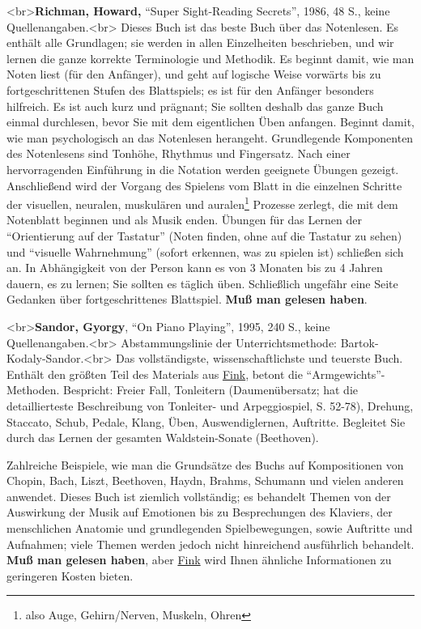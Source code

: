 <br>\textbf{Richman, Howard,} \enquote{Super Sight-Reading Secrets}, 1986, 48 S., keine Quellenangaben.<br>
Dieses Buch ist das beste Buch über das Notenlesen.
Es enthält alle Grundlagen; sie werden in allen Einzelheiten beschrieben, und wir lernen die ganze korrekte Terminologie und Methodik.
Es beginnt damit, wie man Noten liest (für den Anfänger), und geht auf logische Weise vorwärts bis zu fortgeschrittenen Stufen des Blattspiels; es ist für den Anfänger besonders hilfreich.
Es ist auch kurz und prägnant; Sie sollten deshalb das ganze Buch einmal durchlesen, bevor Sie mit dem eigentlichen Üben anfangen.
Beginnt damit, wie man psychologisch an das Notenlesen herangeht.
Grundlegende Komponenten des Notenlesens sind Tonhöhe, Rhythmus und Fingersatz.
Nach einer hervorragenden Einführung in die Notation werden geeignete Übungen gezeigt.
Anschließend wird der Vorgang des Spielens vom Blatt in die einzelnen Schritte der visuellen, neuralen, muskulären und auralen\footnote{also Auge, Gehirn/Nerven, Muskeln, Ohren} Prozesse zerlegt, die mit dem Notenblatt beginnen und als Musik enden.
Übungen für das Lernen der \enquote{Orientierung auf der Tastatur} (Noten finden, ohne auf die Tastatur zu sehen) und \enquote{visuelle Wahrnehmung} (sofort erkennen, was zu spielen ist) schließen sich an.
In Abhängigkeit von der Person kann es von 3 Monaten bis zu 4 Jahren dauern, es zu lernen; Sie sollten es täglich üben.
Schließlich ungefähr eine Seite Gedanken über fortgeschrittenes Blattspiel.
\textbf{Muß man gelesen haben}.


\label{Sandor}

<br>\textbf{Sandor, Gyorgy}, \enquote{On Piano Playing}, 1995, 240 S., keine Quellenangaben.<br>  Abstammungslinie der Unterrichtsmethode: Bartok-Kodaly-Sandor.<br>  Das vollständigste, wissenschaftlichste und teuerste Buch.
Enthält den größten Teil des Materials aus \hyperref[Fink]{Fink}, betont die \enquote{Armgewichts}-Methoden.
Bespricht: Freier Fall, Tonleitern (Daumenübersatz; hat die detaillierteste Beschreibung von Tonleiter- und Arpeggiospiel, S. 52-78), Drehung, Staccato, Schub, Pedale, Klang, Üben, Auswendiglernen, Auftritte.
Begleitet Sie durch das Lernen der gesamten Waldstein-Sonate (Beethoven).

Zahlreiche Beispiele, wie man die Grundsätze des Buchs auf Kompositionen von Chopin, Bach, Liszt, Beethoven, Haydn, Brahms, Schumann und vielen anderen anwendet.
Dieses Buch ist ziemlich vollständig; es behandelt Themen von der Auswirkung der Musik auf Emotionen bis zu Besprechungen des Klaviers, der menschlichen Anatomie und grundlegenden Spielbewegungen, sowie Auftritte und Aufnahmen; viele Themen werden jedoch nicht hinreichend ausführlich behandelt.
\textbf{Muß man gelesen haben}, aber \hyperref[Fink]{Fink} wird Ihnen ähnliche Informationen zu geringeren Kosten bieten.



